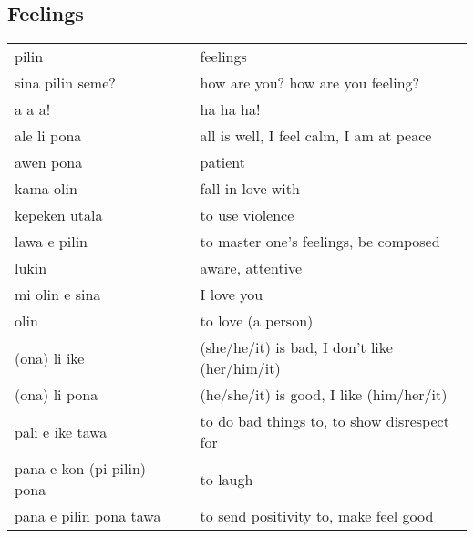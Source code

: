 \subsection{Feelings}
%
\begin{supertabular}{p{4,5cm}|ll}
    pilin                       &  & feelings                                                           \\
    sina pilin seme?            &  & how are you? how are you feeling?                                  \\
    a a a!                      &  & ha ha ha!                                                          \\
    ale li pona                 &  & all is well, I feel calm, I am at peace                            \\
    awen pona                   &  & patient                                                            \\
    kama olin                   &  & fall in love with                                                  \\
    kepeken utala               &  & to use violence                                                    \\
    lawa e pilin                &  & to master one's feelings, be composed                              \\
    lukin                       &  & aware, attentive                                                   \\
    mi olin e sina              &  & I love you                                                         \\
    olin                        &  & to love (a person)                                                 \\
    (ona) li ike                &  & (she/he/it) is bad, I don't like (her/him/it)                      \\
    (ona) li pona               &  & (he/she/it) is good, I like (him/her/it)                           \\
    pali e ike tawa             &  & to do bad things to, to show disrespect for                        \\
    pana e kon (pi pilin) pona  &  & to laugh                                                           \\
    pana e pilin pona tawa      &  & to send positivity to, make feel good                              \\

\end{supertabular}
